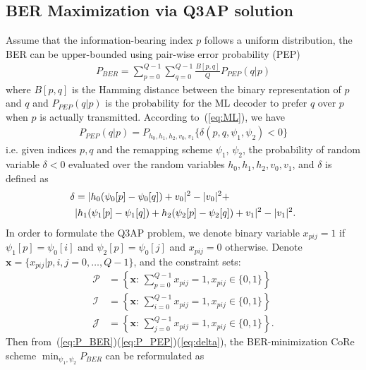 \documentclass[conference]{IEEEtran}
\begin{document}
\subsection{BER Maximization via Q3AP solution}
Assume that the information-bearing index $p$ follows a uniform distribution,
the BER can be upper-bounded using pair-wise error probability (PEP)~\cite{}
\begin{align}
    P_{BER} = \sum_{p=0}^{Q - 1}\sum_{q=0}^{Q - 1}\frac{B[p,
    q]}{Q}P_{PEP}(q | p) \label{eq:P_BER}
\end{align}
where $B[p,q]$ is the Hamming distance between the binary representation of $p$
and $q$ and $P_{PEP}(q | p)$ is the probability for the ML decoder to prefer $q$
over $p$ when $p$ is actually transmitted. According to~(\ref{eq:ML}), we have
\begin{align}
    P_{PEP}(q | p) = P_{h_0,h_1,h_2,v_0,v_1}\{\delta(p,q,\psi_1,\psi_2) < 0\}
    \label{eq:P_PEP}
\end{align}
i.e. given indices $p, q$ and the remapping scheme $\psi_1$, $\psi_2$, the
probability of random variable $\delta<0$ evaluated over the random variables
$h_0,h_1,h_2,v_0,v_1$, and $\delta$ is defined as
\begin{align}
    \delta & = |h_0(\psi_0[p] - \psi_0[q]) + v_0|^2 - |v_0|^2 +\notag\\ 
    &
    |h_1(\psi_1[p] - \psi_1[q])+h_2(\psi_2[p] - \psi_2[q])+v_1|^2 -
    |v_1|^2.
    \label{eq:delta}
\end{align}
In order to formulate the Q3AP problem, we denote binary variable $x_{pij} = 1$
if $\psi_1[p] = \psi_0[i]$ and $\psi_2[p] = \psi_0[j]$ and $x_{pij} = 0$
otherwise.
Denote $\mathbf{x} = \{x_{pij}|p,i,j=0,\ldots,Q-1\}$, and the
constraint sets:
\begin{subequations}
    \begin{align}
        \mathcal{P} & = \left\{\mathbf{x}:\,\sum_{p=0}^{Q-1}x_{pij} = 1,
        x_{pij}\in\{0, 1\}\right\}
        \\
        \mathcal{I} & = \left\{\mathbf{x}:\,\sum_{i=0}^{Q-1}x_{pij} = 1,
        x_{pij}\in\{0, 1\}\right\}
        \\
        \mathcal{J} & = \left\{\mathbf{x}:\,\sum_{j=0}^{Q-1}x_{pij} = 1,
        x_{pij}\in\{0, 1\}\right\}.
    \end{align}
\end{subequations}
Then from~(\ref{eq:P_BER})(\ref{eq:P_PEP})(\ref{eq:delta}), the BER-minimization
CoRe scheme $\min_{\psi_1, \psi_2}P_{BER}$ can be reformulated as
\end{document}
